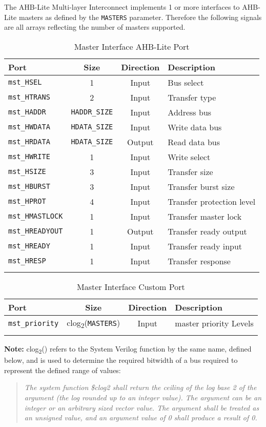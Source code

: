 The AHB-Lite Multi-layer Interconnect implements 1 or more interfaces to AHB-Lite masters
as defined by the \texttt{MASTERS} parameter. Therefore the following signals are all
arrays reflecting the number of masters supported.

\begin{longtable}[]{@{}lccl@{}}
\toprule
Port & Size & Direction & Description\tabularnewline
\midrule
\endhead
\texttt{mst\_HSEL}      & 1                     & Input  & Bus select\tabularnewline
\texttt{mst\_HTRANS}    & 2                     & Input  & Transfer type\tabularnewline
\texttt{mst\_HADDR}     & \texttt{HADDR\_SIZE}  & Input  & Address bus\tabularnewline
\texttt{mst\_HWDATA}    & \texttt{HDATA\_SIZE}  & Input  & Write data bus\tabularnewline
\texttt{mst\_HRDATA}    & \texttt{HDATA\_SIZE}  & Output & Read data bus\tabularnewline
\texttt{mst\_HWRITE}    & 1                     & Input  & Write select\tabularnewline
\texttt{mst\_HSIZE}     & 3                     & Input  & Transfer size\tabularnewline
\texttt{mst\_HBURST}    & 3                     & Input  & Transfer burst size\tabularnewline
\texttt{mst\_HPROT}     & 4                     & Input  & Transfer protection level\tabularnewline
\texttt{mst\_HMASTLOCK} & 1                     & Input  & Transfer master lock\tabularnewline
\texttt{mst\_HREADYOUT} & 1                     & Output & Transfer ready output\tabularnewline
\texttt{mst\_HREADY}    & 1                     & Input  & Transfer ready input\tabularnewline
\texttt{mst\_HRESP}     & 1                     & Input  & Transfer response\tabularnewline
\bottomrule
\caption{Master Interface AHB-Lite Port}
\end{longtable}

\begin{longtable}[]{@{}lccl@{}}
\toprule
Port & Size & Direction & Description\tabularnewline
\midrule
\endhead
\texttt{mst\_priority}  & clog\textsubscript{2}(\texttt{MASTERS}) & Input & master priority Levels\tabularnewline
\bottomrule
\caption{Master Interface Custom Port}
\end{longtable}

\textbf{Note:} clog\textsubscript{2}() refers to the System Verilog function by
the same name, defined below, and is used to determine the required bitwidth of a
bus required to represent the defined range of values:

\begin{quote}
\emph{The system function \$clog2 shall return the ceiling of the log
base 2 of the argument (the log rounded up to an integer value). The
argument can be an integer or an arbitrary sized vector value. The
argument shall be treated as an unsigned value, and an argument value of
0 shall produce a result of 0.}
\end{quote}

